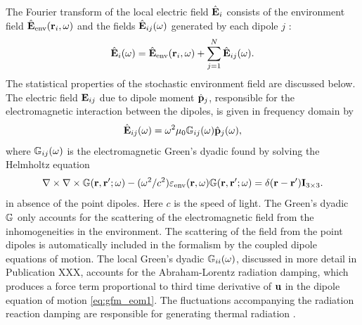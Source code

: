 The Fourier transform of the local electric field $\hat {\mathbf{E}}_i$ consists of the environment field $\hat{\mathbf{E}}_{\textrm{env}}(\mathbf{r}_i,\omega)$ and the fields $\hat {\mathbf{E}}_{ij}(\omega)$ generated by each dipole $j$ \cite{novotny}:
\begin{equation}
 \hat{\mathbf{E}}_i(\omega)= \hat{\mathbf{E}}_{\textrm{env}}(\mathbf{r}_i,\omega) + \sum_{j=1}^N \hat{\mathbf{E}}_{ij}(\omega). \label{eq:gfm_etot}
\end{equation}
The statistical properties of the stochastic environment field are discussed below. The electric field $\mathbf{E}_{ij}$ due to dipole moment $\hat{\mathbf{p}}_j$, responsible for the electromagnetic interaction between the dipoles, is given in frequency domain by \cite{novotny}
\begin{equation}
 \hat{\mathbf{E}}_{ij}(\omega) = \omega^2 \mu_0\mathbb{G}_{ij}(\omega) \hat{\mathbf{p}}_j (\omega), \label{eq:gfm_ekl}
\end{equation}
where $\mathbb{G}_{ij}(\omega)$ is the electromagnetic Green's dyadic found by solving the Helmholtz equation \cite{novotny}
 \begin{equation}
 \nabla \times \nabla \times \mathbb{G}(\mathbf{r},\mathbf{r}';\omega) - (\omega^2/c^2) \varepsilon_{\textrm{env}}(\mathbf{r},\omega)\mathbb{G}(\mathbf{r},\mathbf{r}';\omega)  =  \delta(\mathbf{r}-\mathbf{r}')\mathbf{I}_{3 \times 3}. \label{eq:gemdef}
\end{equation}
in absence of the point dipoles. Here $c$ is the speed of light. The Green's dyadic $\mathbb{G}$ only accounts for the scattering of the electromagnetic field from the inhomogeneities in the environment. The scattering of the field from the point dipoles is automatically included in the formalism by the coupled dipole equations of motion. The local Green's dyadic $\mathbb{G}_{ii}(\omega)$, discussed in more detail in Publication XXX, accounts for the Abraham-Lorentz radiation damping, which produces a force term proportional to third time derivative of $\mathbf{u}$ in the dipole equation of motion \eqref{eq:gfm_eom1}. The fluctuations accompanying the radiation reaction damping are responsible for generating thermal radiation \cite{greffet10}.

